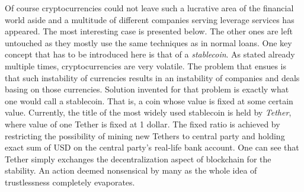 \documentclass[a4paper,12pt,twoside,openany]{report}
\begin{document}
Of course cryptocurrencies could not leave such a lucrative area of the financial world aside and a multitude of different companies serving leverage services has appeared. The most interesting case is presented below. The other ones are left untouched as they mostly use the same techniques as in normal loans. One key concept that has to be introduced here is that of a \textit{stablecoin}. As stated already multiple times, cryptocurrencies are very volatile. The problem that ensues is that such instability of currencies results in an instability of companies and deals basing on those currencies. Solution invented for that problem is exactly what one would call a stablecoin. That is, a coin whose value is fixed at some certain value. Currently, the title of the most widely used stablecoin is held by \textit{Tether}, where value of one Tether is fixed at 1 dollar. The fixed ratio is achieved by restricting the possibility of mining new Tethers to central party and holding exact sum of USD on the central party's real-life bank account. One can see that Tether simply exchanges the decentralization aspect of blockchain for the stability. An action deemed nonsensical by many as the whole idea of trustlessness completely evaporates.
\end{document}
